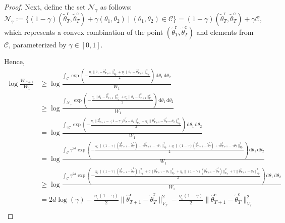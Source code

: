 \documentclass[accepted]{uai2025} %
\theoremstyle{plain}
\theoremstyle{definition}
\theoremstyle{remark}
\begin{document}
\begin{proof}
{Next, define the set \( \mathcal{N}_\gamma \) as follows:
\[
\mathcal{N}_\gamma := \big\{ (1-\gamma)(\tilde{\theta}_T^\mathrm{r}, \tilde{\theta}_T^\mathrm{c}) + \gamma (\theta_1, \theta_2) \mid (\theta_1, \theta_2) \in \mathcal{C} \big\} = (1-\gamma)(\tilde{\theta}_T^\mathrm{r}, \tilde{\theta}_T^\mathrm{c}) + \gamma \mathcal{C},
\]
which represents a convex combination of the point \( (\tilde{\theta}_T^\mathrm{r}, \tilde{\theta}_T^\mathrm{c}) \) and elements from \( \mathcal{C} \), parameterized by \( \gamma \in [0, 1] \).

Hence,
\begin{align*}
    \log\frac{W_{T+1}}{W_{1}} &\geq  \log \frac{\int_{\mathcal{C}} \exp\left( - \frac{\eta_r\lVert\theta_1-\hat{\theta}_{T+1}^\mathrm{r}\rVert^2_{V_{T}}+\eta_c\lVert\theta_2-\hat{\theta}_{T+1}^\mathrm{c}\rVert^2_{V_{T}}}{2} \right) \,\mathrm{d}\theta_1 \,\mathrm{d}\theta_2}{W_{1}} \\
    &\geq \log \frac{\int_{\mathcal{N}_\gamma} \exp\left( - \frac{\eta_r\lVert\theta_1-\hat{\theta}_{T+1}^\mathrm{r}\rVert^2_{V_{T}}+\eta_c\lVert\theta_2-\hat{\theta}_{T+1}^\mathrm{c}\rVert^2_{V_{T}}}{2} \right) \,\mathrm{d}\theta_1\, \mathrm{d}\theta_2}{W_{1}} \\
    &= \log \frac{\int_{\gamma \mathcal{C}} \exp\left( - \frac{\eta_r\lVert\hat{\theta}_{T+1}^\mathrm{r}-(1-\gamma)\tilde{\theta}_T^\mathrm{r}-\theta_1\rVert^2_{V_{T}}+\eta_c\lVert\hat{\theta}_{T+1}^\mathrm{c}-\tilde{\theta}_T^\mathrm{c}-\theta_2\rVert^2_{V_{T}}}{2} \right) \,\mathrm{d}\theta_1\,\mathrm{d}\theta_2}{W_{1}} \\
    &= \log \frac{\int_{\mathcal{C}} \gamma^{2d} \exp\left( - \frac{\eta_r \| (1-\gamma)(\hat{\theta}_{T+1}^\mathrm{r}-\tilde{\theta}_T^\mathrm{r}) + \gamma \hat{\theta}_{T+1}^\mathrm{r} - \gamma \theta_1 \|^2_{V_T}+\eta_c \| (1-\gamma)(\hat{\theta}_{T+1}^\mathrm{c}-\tilde{\theta}_T^\mathrm{c}) + \gamma \hat{\theta}_{T+1}^\mathrm{c} - \gamma \theta_2 \|^2_{V_T}}{2} \right) \,\mathrm{d}\theta_1\, \mathrm{d}\theta_2}{W_{1}} \\
    &\geq \log \frac{\int_{\mathcal{C}} \gamma^{2d} \exp\left( - \frac{\eta_r \| (1-\gamma)(\hat{\theta}_{T+1}^\mathrm{r}-\tilde{\theta}_T^\mathrm{r}) \|^2_{V_T}+\gamma \lVert\hat{\theta}_{T+1}^\mathrm{r} - \theta_1 \rVert^2_{V_T} + \eta_c \| (1-\gamma)(\hat{\theta}_{T+1}^\mathrm{c}-\tilde{\theta}_T^\mathrm{c})  \|^2_{V_T}+\gamma \lVert\hat{\theta}_{T+1}^\mathrm{c} - \theta_2\rVert^2_{V_T}}{2} \right) \,\mathrm{d}\theta_1\, \mathrm{d}\theta_2}{W_{1}} \\
    &=2d\log(\gamma) - \frac{\eta_r(1-\gamma)}{2} \| \hat{\theta}_{T+1}^\mathrm{r} - \tilde{\theta}_T^\mathrm{r} \|_{V_T}^2 -\frac{\eta_c(1-\gamma)}{2} \| \hat{\theta}_{T+1}^\mathrm{c} - \tilde{\theta}_T^\mathrm{c} \|_{V_T}^2  \\ 

\end{align*}}
\end{proof}
\end{document}
